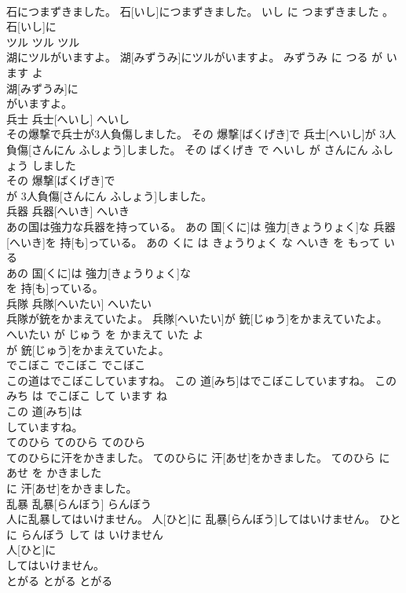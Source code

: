 \documentclass[8pt]{extreport}
\begin{document}
\begin{CJK}{UTF8}{min}
\\	石につまずきました。	石[いし]につまずきました。	いし に つまずきました 。	
\\	石[いし]に
\\	ツル	ツル	ツル	
\\	湖にツルがいますよ。	湖[みずうみ]にツルがいますよ。	みずうみ に つる が います よ	
\\	湖[みずうみ]に
\\	がいますよ。			
\\	兵士	兵士[へいし]	へいし	
\\	その爆撃で兵士が3人負傷しました。	その 爆撃[ばくげき]で 兵士[へいし]が 3人負傷[さんにん ふしょう]しました。	その ばくげき で へいし が さんにん ふしょう しました	
\\	その 爆撃[ばくげき]で
\\	が 3人負傷[さんにん ふしょう]しました。			
\\	兵器	兵器[へいき]	へいき	
\\	あの国は強力な兵器を持っている。	あの 国[くに]は 強力[きょうりょく]な 兵器[へいき]を 持[も]っている。	あの くに は きょうりょく な へいき を もって いる	
\\	あの 国[くに]は 強力[きょうりょく]な
\\	を 持[も]っている。			
\\	兵隊	兵隊[へいたい]	へいたい	
\\	兵隊が銃をかまえていたよ。	兵隊[へいたい]が 銃[じゅう]をかまえていたよ。	へいたい が じゅう を かまえて いた よ	
\\	が 銃[じゅう]をかまえていたよ。			
\\	でこぼこ	でこぼこ	でこぼこ	
\\	この道はでこぼこしていますね。	この 道[みち]はでこぼこしていますね。	この みち は でこぼこ して います ね	
\\	この 道[みち]は
\\	していますね。			
\\	てのひら	てのひら	てのひら	
\\	てのひらに汗をかきました。	てのひらに 汗[あせ]をかきました。	てのひら に あせ を かきました	
\\	に 汗[あせ]をかきました。			
\\	乱暴	乱暴[らんぼう]	らんぼう	
\\	人に乱暴してはいけません。	人[ひと]に 乱暴[らんぼう]してはいけません。	ひと に らんぼう して は いけません	
\\	人[ひと]に
\\	してはいけません。			
\\	とがる	とがる	とがる	

\end{CJK}
\end{document}
